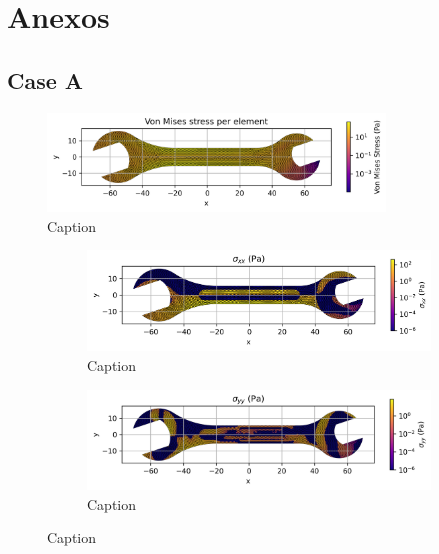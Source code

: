 \section{Anexos}

\subsection{Case A}

\begin{figure}[H]
    \centering
    \includegraphics[width=0.8\textwidth]{GRAFICOS/Case a_von_mises_per_element.png}
    \caption{Caption}
    \label{fig:strain}
  \end{figure}

  \begin{figure}[H]
    \centering
    \begin{subfigure}[t]{0.49\textwidth}
      \centering
      \includegraphics[width=\textwidth]{GRAFICOS/Case a - sigma_xx_per_element.png}
      \caption{Caption}
      \label{fig:deformada_reacciones}
    \end{subfigure}
    \hfill
    \begin{subfigure}[t]{0.49\textwidth}
      \centering
      \includegraphics[width=\textwidth]{GRAFICOS/Case a - sigma_yy_per_element.png}
      \caption{Caption}
      \label{fig:von_mises}
    \end{subfigure}
    \caption{Caption}
    \label{fig:analisis_estructural}
  \end{figure}

